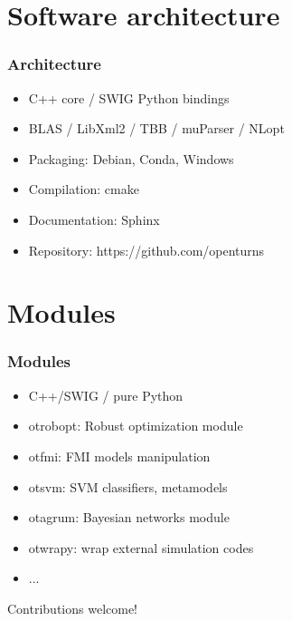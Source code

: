 \documentclass{beamer}
\begin{document}

\section{Software architecture}

\begin{frame}[containsverbatim]
\frametitle{Architecture}

\begin{itemize}
\item C++ core / SWIG Python bindings
\item BLAS / LibXml2 / TBB / muParser / NLopt
\item Packaging: Debian, Conda, Windows
\item Compilation: cmake
\item Documentation: Sphinx
\item Repository: https://github.com/openturns
\end{itemize}

\end{frame}



\section{Modules}

\begin{frame}[containsverbatim]
\frametitle{Modules}

\begin{itemize}
\item C++/SWIG / pure Python

\item otrobopt: Robust optimization module

\item otfmi: FMI models manipulation

\item otsvm: SVM classifiers, metamodels

\item otagrum: Bayesian networks module

\item otwrapy: wrap external simulation codes

\item ...
\end{itemize}

Contributions welcome!

\end{frame}
\end{document}
